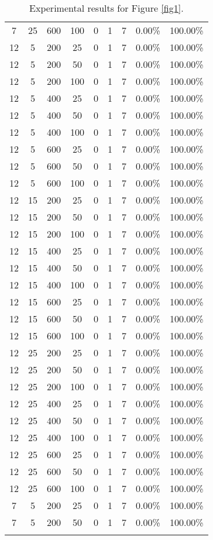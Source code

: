 \begin{center}
{\begin{longtable}{| c | c | c | c | c | c | c | c | c |}
 7 & 25 & 600 & 100 & 0 & 1 & 7 & 0.00\% & 100.00\%   \\
 12 & 5 & 200 & 25 & 0 & 1 & 7 & 0.00\% & 100.00\%   \\
 12 & 5 & 200 & 50 & 0 & 1 & 7 & 0.00\% & 100.00\%   \\
 12 & 5 & 200 & 100 & 0 & 1 & 7 & 0.00\% & 100.00\%   \\
 12 & 5 & 400 & 25 & 0 & 1 & 7 & 0.00\% & 100.00\%   \\
 12 & 5 & 400 & 50 & 0 & 1 & 7 & 0.00\% & 100.00\%   \\
 12 & 5 & 400 & 100 & 0 & 1 & 7 & 0.00\% & 100.00\%   \\
 12 & 5 & 600 & 25 & 0 & 1 & 7 & 0.00\% & 100.00\%   \\
 12 & 5 & 600 & 50 & 0 & 1 & 7 & 0.00\% & 100.00\%   \\
 12 & 5 & 600 & 100 & 0 & 1 & 7 & 0.00\% & 100.00\%   \\
 12 & 15 & 200 & 25 & 0 & 1 & 7 & 0.00\% & 100.00\%   \\
 12 & 15 & 200 & 50 & 0 & 1 & 7 & 0.00\% & 100.00\%   \\
 12 & 15 & 200 & 100 & 0 & 1 & 7 & 0.00\% & 100.00\%   \\
 12 & 15 & 400 & 25 & 0 & 1 & 7 & 0.00\% & 100.00\%   \\
 12 & 15 & 400 & 50 & 0 & 1 & 7 & 0.00\% & 100.00\%   \\
 12 & 15 & 400 & 100 & 0 & 1 & 7 & 0.00\% & 100.00\%   \\
 12 & 15 & 600 & 25 & 0 & 1 & 7 & 0.00\% & 100.00\%   \\
 12 & 15 & 600 & 50 & 0 & 1 & 7 & 0.00\% & 100.00\%   \\
 12 & 15 & 600 & 100 & 0 & 1 & 7 & 0.00\% & 100.00\%   \\
 12 & 25 & 200 & 25 & 0 & 1 & 7 & 0.00\% & 100.00\%   \\
 12 & 25 & 200 & 50 & 0 & 1 & 7 & 0.00\% & 100.00\%   \\
 12 & 25 & 200 & 100 & 0 & 1 & 7 & 0.00\% & 100.00\%   \\
 12 & 25 & 400 & 25 & 0 & 1 & 7 & 0.00\% & 100.00\%   \\
 12 & 25 & 400 & 50 & 0 & 1 & 7 & 0.00\% & 100.00\%   \\
 12 & 25 & 400 & 100 & 0 & 1 & 7 & 0.00\% & 100.00\%   \\
 12 & 25 & 600 & 25 & 0 & 1 & 7 & 0.00\% & 100.00\%   \\
 12 & 25 & 600 & 50 & 0 & 1 & 7 & 0.00\% & 100.00\%   \\
 12 & 25 & 600 & 100 & 0 & 1 & 7 & 0.00\% & 100.00\%   \\
 7 & 5 & 200 & 25 & 0 & 1 & 7 & 0.00\% & 100.00\%   \\
 7 & 5 & 200 & 50 & 0 & 1 & 7 & 0.00\% & 100.00\%   \\ \hline 
\caption{Experimental results for Figure \ref{fig1}.}
\label{tbl1}
\end{longtable}
}
\end{center}

